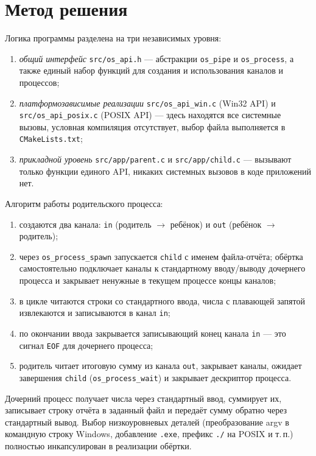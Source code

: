 \section{Метод решения}

Логика программы разделена на три независимых уровня:
\begin{enumerate}
  \item \emph{общий интерфейс} \texttt{src/os\_api.h} --- абстракции \texttt{os\_pipe} и
    \texttt{os\_process}, а также единый набор функций для создания и использования каналов и
    процессов;
  \item \emph{платформозависимые реализации} \texttt{src/os\_api\_win.c} (Win32 API) и
    \texttt{src/os\_api\_posix.c} (POSIX API) --- здесь находятся все системные вызовы, условная
    компиляция отсутствует, выбор файла выполняется в \texttt{CMakeLists.txt};
  \item \emph{прикладной уровень} \texttt{src/app/parent.c} и \texttt{src/app/child.c} --- вызывают только
    функции единого API, никаких системных вызовов в коде приложений нет.
\end{enumerate}

Алгоритм работы родительского процесса:
\begin{enumerate}
  \item создаются два канала: \texttt{in} (родитель $\rightarrow$ ребёнок) и \texttt{out}
    (ребёнок $\rightarrow$ родитель);
  \item через \texttt{os\_process\_spawn} запускается \texttt{child} с именем файла-отчёта;
    обёртка самостоятельно подключает каналы к стандартному вводу/выводу дочернего процесса и
    закрывает ненужные в текущем процессе концы каналов;
  \item в цикле читаются строки со стандартного ввода, числа с плавающей запятой извлекаются и
    записываются в канал \texttt{in};
  \item по окончании ввода закрывается записывающий конец канала \texttt{in} --- это сигнал
    \texttt{EOF} для дочернего процесса;
  \item родитель читает итоговую сумму из канала \texttt{out}, закрывает каналы, ожидает
    завершения \texttt{child} (\texttt{os\_process\_wait}) и закрывает дескриптор процесса.
\end{enumerate}

Дочерний процесс получает числа через стандартный ввод, суммирует их, записывает строку отчёта в
заданный файл и передаёт сумму обратно через стандартный вывод. Выбор низкоуровневых деталей
(преобразование argv в командную строку Windows, добавление \texttt{.exe}, префикс \texttt{./}
на POSIX и т.\,п.) полностью инкапсулирован в реализации обёртки.

